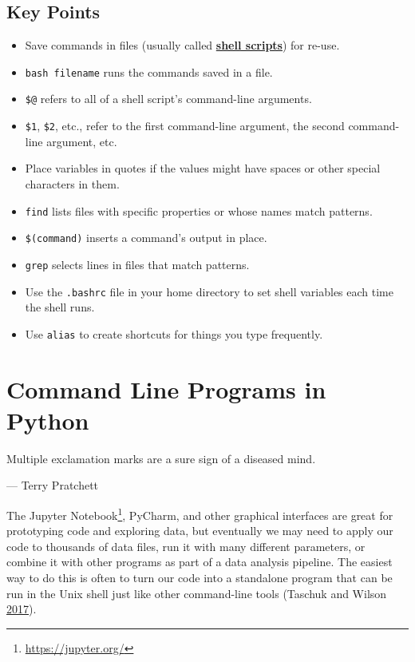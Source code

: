 \documentclass[
]{krantz}
\providecommand{\tightlist}{%
  \setlength{\itemsep}{0pt}\setlength{\parskip}{0pt}}
\renewenvironment{quote}{\begin{VF}}{\end{VF}}
\renewcommand{\href}[2]{#2\footnote{\url{#1}}}
\newcommand{\gref}[2]{\hyperlink{#2}{\textbf{#1}}}
\begin{document}
\hypertarget{bash-advanced-keypoints}{%
\section{Key Points}\label{bash-advanced-keypoints}}

\begin{itemize}
\tightlist
\item
  Save commands in files (usually called \gref{shell scripts}{shell\_script}) for re-use.
\item
  \texttt{bash\ filename} runs the commands saved in a file.
\item
  \texttt{\$@} refers to all of a shell script's command-line arguments.
\item
  \texttt{\$1}, \texttt{\$2}, etc., refer to the first command-line argument, the second command-line argument, etc.
\item
  Place variables in quotes if the values might have spaces or other special characters in them.
\item
  \texttt{find} lists files with specific properties or whose names match patterns.
\item
  \texttt{\$(command)} inserts a command's output in place.
\item
  \texttt{grep} selects lines in files that match patterns.
\item
  Use the \texttt{.bashrc} file in your home directory to set shell variables each time the shell runs.
\item
  Use \texttt{alias} to create shortcuts for things you type frequently.
\end{itemize}

\hypertarget{scripting}{%
\chapter{Command Line Programs in Python}\label{scripting}}

\begin{quote}
Multiple exclamation marks are a sure sign of a diseased mind.

--- Terry Pratchett
\end{quote}

The \href{https://jupyter.org/}{Jupyter Notebook}, PyCharm, and other graphical interfaces
are great for prototyping code and exploring data,
but eventually we may need to apply our code to thousands of data files,
run it with many different parameters,
or combine it with other programs as part of a data analysis pipeline.
The easiest way to do this is often
to turn our code into a standalone program that can be run in the Unix shell
just like other command-line tools (Taschuk and Wilson \protect\hyperlink{ref-Tasc2017}{2017}).
\end{document}
